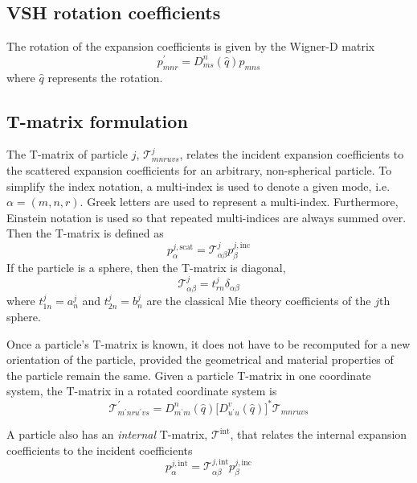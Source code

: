 \documentclass[11pt]{article}
\begin{document}
\subsection{VSH rotation coefficients}
The rotation of the expansion coefficients is given by the Wigner-D matrix
\begin{equation}
    p_{mnr}^\prime = D_{ms}^{n}(\hat q) p_{mns}
\end{equation}
where $\hat q$ represents the rotation.

\subsection{T-matrix formulation}
\newcommand{\tmatrix}{\mathcal{T}}
The T-matrix of particle $j$, $\tmatrix_{mnruvs}^j$, relates the incident expansion coefficients to the scattered expansion coefficients for an arbitrary, non-spherical particle.
To simplify the index notation, a multi-index is used to denote a given mode, i.e.\ $\alpha = (m,n,r)$.
Greek letters are used to represent a multi-index.
Furthermore, Einstein notation is used so that repeated multi-indices are always summed over.
Then the T-matrix is defined as
\begin{equation}
    p_\alpha^{j,\text{scat}} = \tmatrix_{\alpha\beta}^j p_\beta^{j,\text{inc}}
\label{eqn:tmatrix_defintion}
\end{equation}
If the particle is a sphere, then the T-matrix is diagonal,
\begin{equation}
    \tmatrix_{\alpha\beta}^j = t_{rn}^j \delta_{\alpha\beta}
\label{eqn:tmatrix_sphere}
\end{equation}
where $t_{1n}^j = a_n^j$ and $t_{2n}^j = b_n^j$ are the classical Mie theory coefficients of the $j$th sphere.\cite{bohren2008absorption}

Once a particle's T-matrix is known, it does not have to be recomputed for a new orientation of the particle, provided the geometrical and material properties of the particle remain the same.
Given a particle T-matrix in one coordinate system, the T-matrix in a rotated coordinate system is
\begin{equation}
    \tmatrix_{m^\prime nr u^\prime vs}^\prime = D_{m^\prime m}^n(\hat q) \lbrack D_{u^\prime u}^v(\hat q) \rbrack^* \tmatrix_{mnruvs}
\end{equation}

A particle also has an \emph{internal} T-matrix, $\tmatrix^\text{int}$, that relates the internal expansion coefficients to the incident coefficients
\begin{equation}
    p_\alpha^{j,\text{int}} = \tmatrix_{\alpha\beta}^{j,\text{int}} p_\beta^{j,\text{inc}}
\label{eqn:tmatrix_internal_defintion}
\end{equation}
\end{document}
